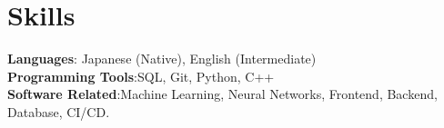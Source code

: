 \section{Skills}
    \begin{itemize}[leftmargin=0.15in, label={}]
	\small{\item{
		\textbf{Languages}{: Japanese (Native), English (Intermediate) } \\
		\textbf{Programming Tools}{:SQL, Git, Python, C++} \\
		\textbf{Software Related}{:Machine Learning, Neural Networks, Frontend, Backend, Database, CI/CD.}
	}}
    \end{itemize}